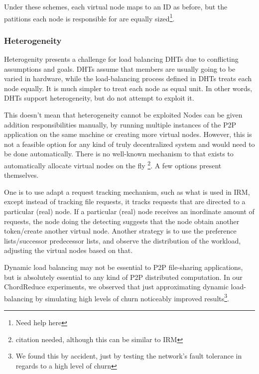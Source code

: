 \documentclass[10pt,letterpaper,twoside]{report}
\begin{document}
Under these schemes, each virtual node maps to an ID as before, but the patitions each node is responsible for are equally sized\footnote{Need help here}.

\subsubsection{Heterogeneity}
\label{subsec:hetero}
Heterogenity presents a challenge for load balancing DHTs due to conflicting assumptions and goals. 
DHTs assume that members are usually going to be varied in hardware, while the load-balancing process defined in DHTs treats each node equally.
It is much simpler to treat each node as equal unit.
In other words, DHTs support heterogeneity, but do not attempt to exploit it.

This doesn't mean that heterogeneity cannot be exploited
Nodes can be given addition responsibilities manually, by running multiple instances of the P2P application on the same machine or creating more virtual nodes.
However, this is not a feasible option for any kind of truly decentralized system and would need to be done automatically.
There is no well-known mechanism to that exists to automatically  allocate virtual nodes on the fly \footnote{citation needed, although this can be similar to IRM}. 
A few options present themselves.  %

One is to use adapt a request tracking mechanism, such as what is used in IRM, except instead of tracking file requests, it tracks requests that are directed to a particular (real) node. 
If a particular (real) node receives an inordinate amount of requests, the node doing the detecting suggests that the node obtain another token/create another virtual node.
Another strategy is to use the preference lists/successor predecessor lists, and observe the distribution of the workload, adjusting the virtual nodes based on that. 

Dynamic load balancing may not be essential to P2P file-sharing applications, but is absolutely essential to any kind of P2P distributed computation.
In our ChordReduce experiments, we observed that just approximating dynamic load-balancing by simulating high levels of churn noticeably improved results\footnote{We found this by accident, just by testing the network's fault tolerance in regards to a high level of churn}.



\end{document}
